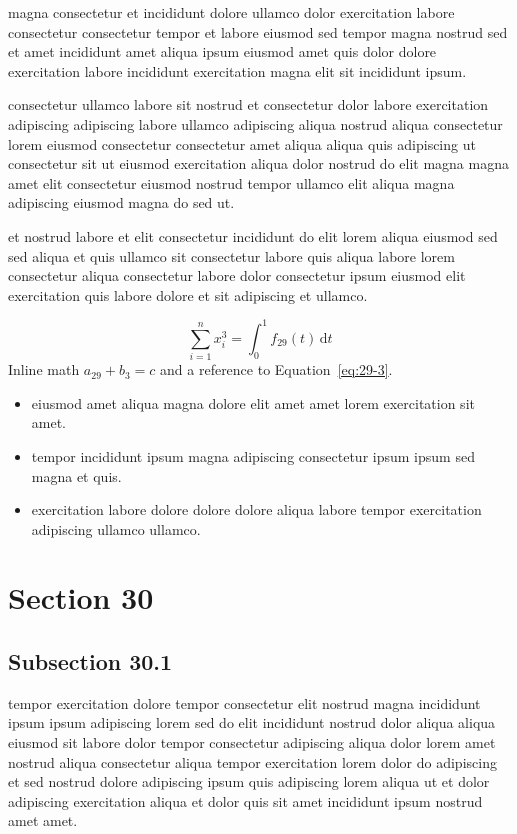 \documentclass{article}
\begin{document}
magna consectetur et incididunt dolore ullamco dolor exercitation labore consectetur consectetur tempor et labore eiusmod sed tempor magna nostrud sed et amet incididunt amet aliqua ipsum eiusmod amet quis dolor dolore exercitation labore incididunt exercitation magna elit sit incididunt ipsum.

consectetur ullamco labore sit nostrud et consectetur dolor labore exercitation adipiscing adipiscing labore ullamco adipiscing aliqua nostrud aliqua consectetur lorem eiusmod consectetur consectetur amet aliqua aliqua quis adipiscing ut consectetur sit ut eiusmod exercitation aliqua dolor nostrud do elit magna magna amet elit consectetur eiusmod nostrud tempor ullamco elit aliqua magna adipiscing eiusmod magna do sed ut.

et nostrud labore et elit consectetur incididunt do elit lorem aliqua eiusmod sed sed aliqua et quis ullamco sit consectetur labore quis aliqua labore lorem consectetur aliqua consectetur labore dolor consectetur ipsum eiusmod elit exercitation quis labore dolore et sit adipiscing et ullamco.

\begin{equation}\label{eq:29-3}
  \sum_{i=1}^{n} x_i^{3} = \int_0^1 f_{29}(t)\,\mathrm{d}t
\end{equation}
Inline math $a_{29} + b_{3} = c$ and a reference to Equation~\eqref{eq:29-3}.

\begin{itemize}
  \item eiusmod amet aliqua magna dolore elit amet amet lorem exercitation sit amet.
  \item tempor incididunt ipsum magna adipiscing consectetur ipsum ipsum sed magna et quis.
  \item exercitation labore dolore dolore dolore aliqua labore tempor exercitation adipiscing ullamco ullamco.
\end{itemize}

\section{Section 30}\label{sec:30}
\subsection{Subsection 30.1}\label{sec:30-1}
tempor exercitation dolore tempor consectetur elit nostrud magna incididunt ipsum ipsum adipiscing lorem sed do elit incididunt nostrud dolor aliqua aliqua eiusmod sit labore dolor tempor consectetur adipiscing aliqua dolor lorem amet nostrud aliqua consectetur aliqua tempor exercitation lorem dolor do adipiscing et sed nostrud dolore adipiscing ipsum quis adipiscing lorem aliqua ut et dolor adipiscing exercitation aliqua et dolor quis sit amet incididunt ipsum nostrud amet amet.
\end{document}
